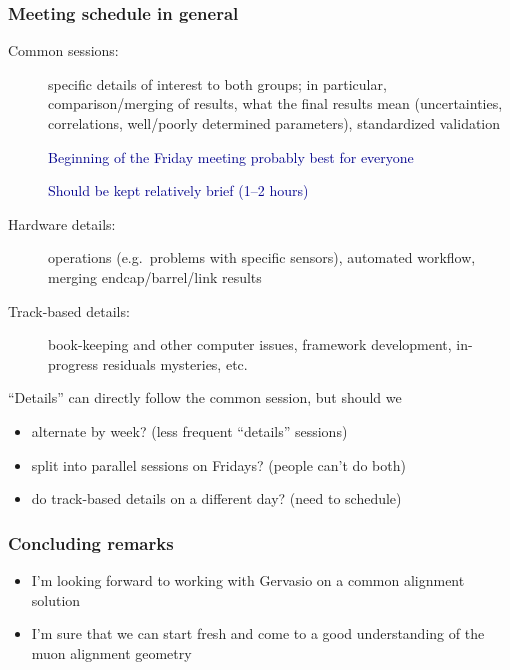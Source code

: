 \documentclass[compress]{beamer}
\begin{document}
\begin{frame}
\frametitle{Meeting schedule in general}
\begin{description}
\item[Common sessions:] specific details of interest to both groups;
  in particular, comparison/merging of results, what the final results
  mean (uncertainties, correlations, well/poorly determined
  parameters), standardized validation

\textcolor{darkblue}{Beginning of the Friday meeting probably best for everyone}

\textcolor{darkblue}{Should be kept relatively brief (1--2 hours)}

\item[Hardware details:] operations (e.g.\ problems with specific
  sensors), automated workflow, merging endcap/barrel/link results

\item[Track-based details:] book-keeping and other computer issues,
  framework development, in-progress residuals mysteries, etc.
\end{description}

``Details'' can directly follow the common session, but should we
\begin{itemize}
\item alternate by week?  (less frequent ``details'' sessions)
\item split into parallel sessions on Fridays?  (people can't do both)
\item do track-based details on a different day? (need to schedule)
\end{itemize}
\end{frame}


\begin{frame}
\frametitle{Concluding remarks}
\begin{itemize}
\item I'm looking forward to working with Gervasio on a common alignment solution

\item I'm sure that we can start fresh and come to a good understanding of the muon alignment geometry
\end{itemize}
\label{numpages}
\end{frame}
\end{document}
